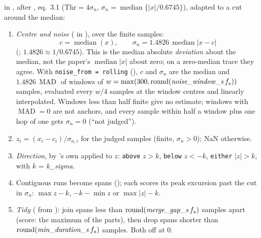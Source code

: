  in , after
\citet{quianquiroga2004unsupervised}, eq.~3.1 ($\mathrm{Thr} = 4\sigma_n$,
$\sigma_n = \operatorname{median}\{|x|/0.6745\}$), adapted to a cut around the median:
\begin{enumerate}
\item \emph{Centre and noise} ( in
  ), over the finite samples:
  \[
  c = \operatorname{median}(x),\qquad
  \sigma_n = 1.4826\,\operatorname{median}|x - c|
  \]
  (; $1.4826 \approx 1/0.6745$). This is the median absolute
  \emph{deviation} about the median, not the paper's $\operatorname{median}|x|$ about zero; on
  a zero-median trace they agree. With \texttt{noise\_from = rolling} (),
  $c$ and $\sigma_n$ are the median and $1.4826\,\operatorname{MAD}$ of windows of
  $w = \max(300, \operatorname{round}(\text{\emph{noise\_window\_s}}\,f_s))$ samples, evaluated
  every $w/4$ samples at the window centres and linearly interpolated. Windows less than half
  finite give no estimate; windows with $\operatorname{MAD} = 0$ are not anchors, and every
  sample within half a window plus one hop of one gets $\sigma_n = 0$ (``not judged'').
\item $z_i = (x_i - c_i)/\sigma_{n,i}$ for the judged samples (finite, $\sigma_n > 0$); NaN
  otherwise.
\item \emph{Direction}, by 's own
   applied to $z$: \texttt{above} $z > k$, \texttt{below} $z < -k$,
  \texttt{either} $|z| > k$, with $k$ = \emph{k\_sigma}.
\item Contiguous runs become spans (); each scores its peak excursion
  past the cut in $\sigma_n$: $\max z - k$, $-k - \min z$ or $\max|z| - k$.
\item \emph{Tidy} ( from ): join spans
  less than $\operatorname{round}(\text{\emph{merge\_gap\_s}}\,f_s)$ samples apart (score: the
  maximum of the parts), then drop spans shorter than
  $\operatorname{round}(\text{\emph{min\_duration\_s}}\,f_s)$ samples. Both off at 0.
\end{enumerate}

